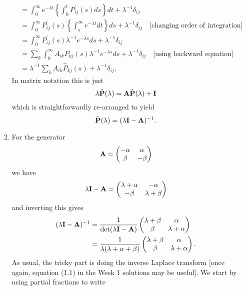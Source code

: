 \documentclass[11pt,a4paper]{article}
\begin{document}
\begin{enumerate}
\begin{enumerate}
\begin{align*}
        &= \int_0^\infty e^{-\lambda t}\left\{\int_0^t P^\prime_{ij}(s)ds\right\}dt + \lambda^{-1}\delta_{ij}\\
        &= \int_0^\infty P^\prime_{ij}(s)\left\{\int_s^\infty e^{-\lambda t}dt\right\}ds + \lambda^{-1}\delta_{ij}\quad \text{[changing order of integration]}\\
        &= \int_0^\infty P^\prime_{ij}(s)\lambda^{-1}e^{-\lambda s}ds + \lambda^{-1}\delta_{ij}\\
        &= \sum_{k}\int_0^\infty A_{ik}P_{kj}(s)\lambda^{-1}e^{-\lambda s}ds + \lambda^{-1}\delta_{ij}\quad\text{[using backward equation]}\\
        &= \lambda^{-1}\sum_k A_{ik}\hat{P}_{kj}(s) + \lambda^{-1}\delta_{ij}.
      \end{align*}
      In matrix notation this is just
      $$
      \lambda\hat{\vb{P}}(\lambda) = \vb{A}\hat{\vb{P}}(\lambda) + \vb{I}
      $$
      which is straightforwardly re-arranged to yield
      $$
      \hat{\vb{P}}(\lambda) = (\lambda\vb{I} - \vb{A})^{-1}.
      $$
      \item For the generator
      $$
      \vb{A} =
      \begin{pmatrix}
        -\alpha & \alpha\\
        \beta & -\beta
      \end{pmatrix}
      $$
      we have
      $$
      \lambda\vb{I} - \vb{A} =
      \begin{pmatrix}
        \lambda + \alpha & -\alpha\\
        -\beta & \lambda + \beta
      \end{pmatrix}
      $$
      and inverting this gives
      \begin{align*}
        (\lambda\vb{I} - \vb{A})^{-1} 
        &= \frac{1}{\det(\lambda\vb{I} - \vb{A})}
        \begin{pmatrix}
          \lambda + \beta & \alpha\\
          \beta & \lambda + \alpha
        \end{pmatrix}\\
        &= \frac{1}{\lambda(\lambda + \alpha + \beta)}
        \begin{pmatrix}
          \lambda + \beta & \alpha\\
          \beta & \lambda + \alpha
        \end{pmatrix}.
      \end{align*}
      As usual, the tricky part is doing the inverse Laplace transform [once again, equation (1.1) in the Week 1 solutions may be useful]. We start by using partial fractions to write

\end{enumerate}
\end{enumerate}
\end{document}
